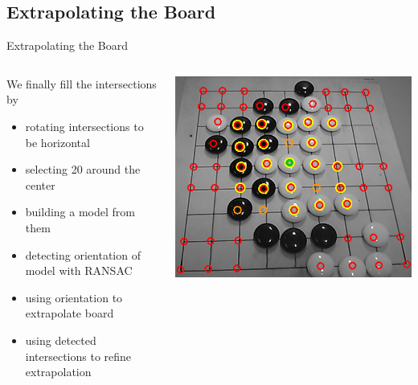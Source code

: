 \documentclass[table]{beamer}
\begin{document}
\subsection{Extrapolating the Board}
\begin{frame}{Extrapolating the Board}
	\begin{columns}
		\begin{column}{0.6\textwidth}
			We finally fill the intersections by
			\begin{itemize}
				\item rotating intersections to be horizontal
				\item selecting 20 around the center
				\item building a model from them
				\item detecting orientation of model with RANSAC
				\item using orientation to extrapolate board
				\item using detected intersections to refine extrapolation
			\end{itemize}
		\end{column}
		\begin{column}{0.3\textwidth}
			\includegraphics[width=\columnwidth]{images/buildingModel.png}\\

\end{column}
\end{columns}
\end{frame}
\end{document}
